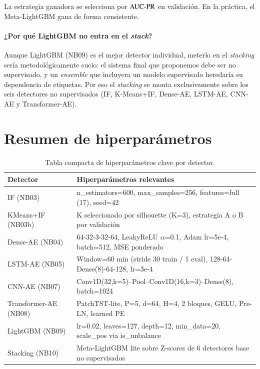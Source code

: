 La estrategia ganadora se selecciona por $\text{AUC-PR}$ en validación. En la práctica, el Meta-LightGBM gana de forma consistente.

\paragraph{¿Por qué LightGBM no entra en el \textit{stack}?} Aunque LightGBM (NB09) es el mejor detector individual, meterlo en el \textit{stacking} sería metodológicamente sucio: el sistema final que proponemos debe ser no supervisado, y un \textit{ensemble} que incluyera un modelo supervisado heredaría su dependencia de etiquetas. Por eso el \textit{stacking} se monta exclusivamente sobre los seis detectores no supervisados (IF, K-Means+IF, Dense-AE, LSTM-AE, CNN-AE y Transformer-AE).

\section{Resumen de hiperparámetros}

\begin{table}[H]
\centering
\caption{Tabla compacta de hiperparámetros clave por detector.}
\label{tab:hparams}
\footnotesize
\begin{tabularx}{\textwidth}{l X}
\toprule
Detector & Hiperparámetros relevantes \\
\midrule
IF (NB03)              & n\_estimators=600, max\_samples=256, features=full (17), seed=42 \\
KMeans+IF (NB03b)      & K seleccionado por silhouette (K=3), estrategia A o B por validación \\
Dense-AE (NB04)        & 64-32-3-32-64, LeakyReLU $\alpha$=0.1, Adam lr=5e-4, batch=512, MSE ponderado \\
LSTM-AE (NB05)         & Window=60 min (stride 30 train / 1 eval), 128-64-Dense(8)-64-128, lr=3e-4 \\
CNN-AE (NB07)          & Conv1D(32,k=5)–Pool–Conv1D(16,k=3)–Dense(8), batch=1024 \\
Transformer-AE (NB08)  & PatchTST-lite, P=5, d=64, H=4, 2 bloques, GELU, Pre-LN, learned PE \\
LightGBM (NB09)        & lr=0.02, leaves=127, depth=12, min\_data=20, scale\_pos via is\_unbalance \\
Stacking (NB10)        & Meta-LightGBM lite sobre Z-scores de 6 detectores base no supervisados \\
\bottomrule
\end{tabularx}
\end{table}

